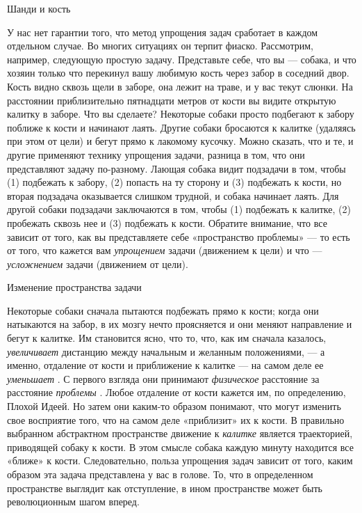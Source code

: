 \documentclass[../main.tex]{subfiles}
\begin{document}
Шанди и кость

У нас нет гарантии того, что метод упрощения задач сработает в каждом отдельном случае. Во многих ситуациях он терпит фиаско. Рассмотрим, например, следующую простую задачу. Представьте себе, что вы --- собака, и что хозяин только что перекинул вашу любимую кость через забор в соседний двор. Кость видно сквозь щели в заборе, она лежит на траве, и у вас текут слюнки. На расстоянии приблизительно пятнадцати метров от кости вы видите открытую калитку в заборе. Что вы сделаете? Некоторые собаки просто подбегают к забору поближе к кости и начинают лаять. Другие собаки бросаются к калитке (удаляясь при этом от цели) и бегут прямо к лакомому кусочку. Можно сказать, что и те, и другие применяют технику упрощения задачи, разница в том, что они представляют задачу по-разному. Лающая собака видит подзадачи в том, чтобы (1) подбежать к забору, (2) попасть на ту сторону и (3) подбежать к кости, но вторая подзадача оказывается слишком трудной, и собака начинает лаять. Для другой собаки подзадачи заключаются в том, чтобы (1) подбежать к калитке, (2) пробежать сквозь нее и (3) подбежать к кости. Обратите внимание, что все зависит от того, как вы представляете себе «пространство проблемы» --- то есть от того, что кажется вам \emph{упрощением} задачи (движением к цели) и что --- \emph{усложнением} задачи (движением от цели).

Изменение пространства задачи

Некоторые собаки сначала пытаются подбежать прямо к кости; когда они натыкаются на забор, в их мозгу нечто проясняется и они меняют направление и бегут к калитке. Им становится ясно, что то, что, как им сначала казалось, \emph{увеличивает} дистанцию между начальным и желанным положениями, --- а именно, отдаление от кости и приближение к калитке --- на самом деле ее \emph{уменьшает} . С первого взгляда они принимают \emph{физическое} расстояние за расстояние \emph{проблемы} . Любое отдаление от кости кажется им, по определению, Плохой Идеей. Но затем они каким-то образом понимают, что могут изменить свое восприятие того, что на самом деле «приблизит» их к кости. В правильно выбранном абстрактном пространстве движение к \emph{калитке} является траекторией, приводящей собаку к кости. В этом смысле собака каждую минуту находится все «ближе» к кости. Следовательно, польза упрощения задач зависит от того, каким образом эта задача представлена у вас в голове. То, что в определенном пространстве выглядит как отступление, в ином пространстве может быть революционным шагом вперед.
\end{document}
